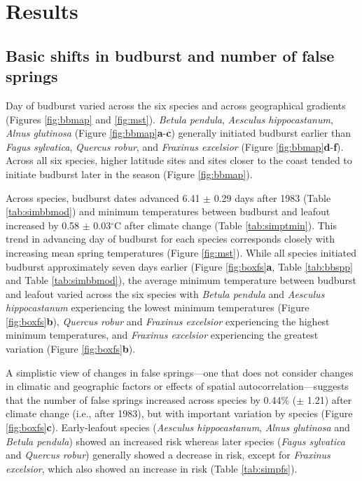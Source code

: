 \documentclass{article}\usepackage[]{graphicx}\usepackage[]{color}
\begin{document}
\section*{Results} %
\subsection*{Basic shifts in budburst and number of false springs}
Day of budburst varied across the six species and across geographical gradients (Figures \ref{fig:bbmap} and \ref{fig:mst}). \textit{Betula pendula}, \textit{Aesculus hippocastanum}, \textit{Alnus glutinosa} (Figure \ref{fig:bbmap}\textbf{a}-\textbf{c}) generally initiated budburst earlier than \textit{Fagus sylvatica}, \textit{Quercus robur}, and \textit{Fraxinus excelsior} (Figure \ref{fig:bbmap}\textbf{d}-\textbf{f}). Across all six species, higher latitude sites and sites closer to the coast tended to initiate budburst later in the season (Figure \ref{fig:bbmap}).  

Across species, budburst dates advanced 6.41 $\pm$ 0.29 days after 1983 (Table \ref{tab:simbbmod}) and minimum temperatures between budburst and leafout increased by 0.58 $\pm$ 0.03$^{\circ}$C after climate change (Table \ref{tab:simptmin}). This trend in advancing day of budburst for each species corresponds closely with increasing mean spring temperatures (Figure \ref{fig:mst}). While all species initiated budburst approximately seven days earlier (Figure \ref{fig:boxfs}\textbf{a}, Table \ref{tab:bbspp} and Table \ref{tab:simbbmod}), the average minimum temperature between budburst and leafout varied across the six species with \textit{Betula pendula} and \textit{Aesculus hippocastanum} experiencing the lowest minimum temperatures (Figure \ref{fig:boxfs}\textbf{b}), \textit{Quercus robur} and \textit{Fraxinus excelsior} experiencing the highest minimum temperatures, and \textit{Fraxinus excelsior} experiencing the greatest variation (Figure \ref{fig:boxfs}\textbf{b}). 

A simplistic view of changes in false springs---one that does not consider changes in climatic and geographic factors or effects of spatial autocorrelation---suggests that the number of false springs increased across species by 0.44\% ($\pm$ 1.21) after climate change (i.e., after 1983), but with important variation by species (Figure \ref{fig:boxfs}\textbf{c}). Early-leafout species (\textit{Aesculus hippocastanum}, \textit{Alnus glutinosa} and \textit{Betula pendula}) showed an increased risk whereas later species (\textit{Fagus sylvatica} and \textit{Quercus robur}) generally showed a decrease in risk, except for \textit{Fraxinus excelsior}, which also showed an increase in risk (Table \ref{tab:simpfs}). 
\end{document}
